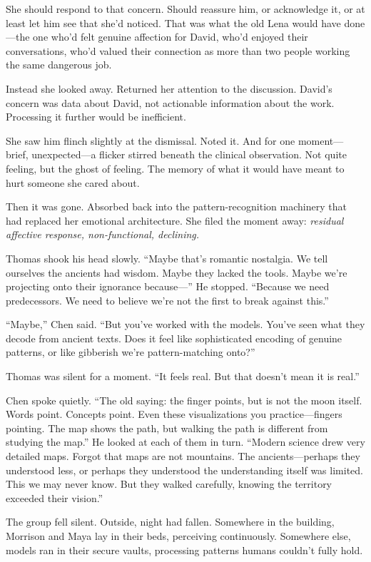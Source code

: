 She should respond to that concern. Should reassure him, or acknowledge it, or at least let him see that she'd noticed. That was what the old Lena would have done—the one who'd felt genuine affection for David, who'd enjoyed their conversations, who'd valued their connection as more than two people working the same dangerous job.

Instead she looked away. Returned her attention to the discussion. David's concern was data about David, not actionable information about the work. Processing it further would be inefficient.

She saw him flinch slightly at the dismissal. Noted it. And for one moment—brief, unexpected—a flicker stirred beneath the clinical observation. Not quite feeling, but the ghost of feeling. The memory of what it would have meant to hurt someone she cared about.

Then it was gone. Absorbed back into the pattern-recognition machinery that had replaced her emotional architecture. She filed the moment away: \textit{residual affective response, non-functional, declining.}

Thomas shook his head slowly. ``Maybe that's romantic nostalgia. We tell ourselves the ancients had wisdom. Maybe they lacked the tools. Maybe we're projecting onto their ignorance because—'' He stopped. ``Because we need predecessors. We need to believe we're not the first to break against this.''

``Maybe,'' Chen said. ``But you've worked with the models. You've seen what they decode from ancient texts. Does it feel like sophisticated encoding of genuine patterns, or like gibberish we're pattern-matching onto?''

Thomas was silent for a moment. ``It feels real. But that doesn't mean it is real.''

Chen spoke quietly. ``The old saying: the finger points, but is not the moon itself. Words point. Concepts point. Even these visualizations you practice—fingers pointing. The map shows the path, but walking the path is different from studying the map.'' He looked at each of them in turn. ``Modern science drew very detailed maps. Forgot that maps are not mountains. The ancients—perhaps they understood less, or perhaps they understood the understanding itself was limited. This we may never know. But they walked carefully, knowing the territory exceeded their vision.''

The group fell silent. Outside, night had fallen. Somewhere in the building, Morrison and Maya lay in their beds, perceiving continuously. Somewhere else, models ran in their secure vaults, processing patterns humans couldn't fully hold.

